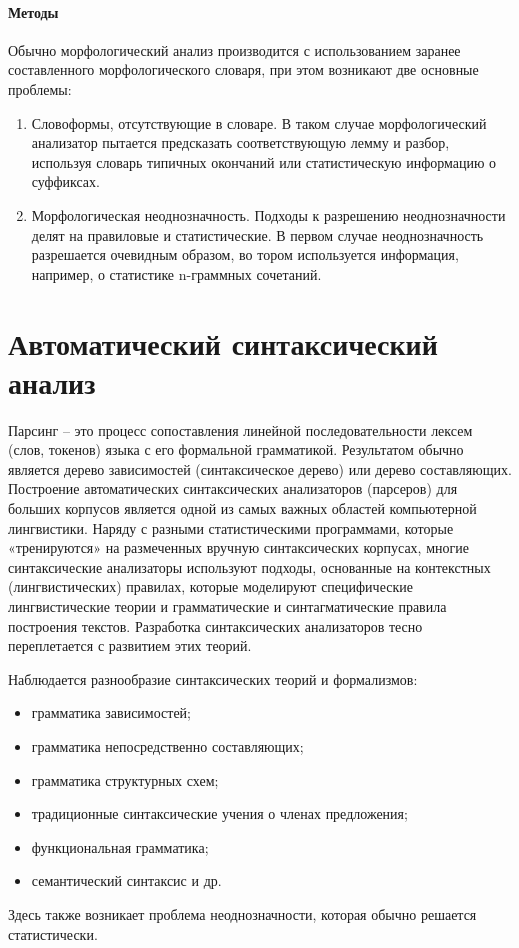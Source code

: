 \documentclass[12pt]{article}
\theoremstyle{definition}
\theoremstyle{remark}
\numberwithin{equation}{section}
\begin{document}
\paragraph{Методы}
Обычно морфологический анализ производится с использованием заранее составленного морфологического словаря, при этом возникают две основные проблемы:
\begin{enumerate}
	\item Словоформы, отсутствующие в словаре. В таком случае морфологический анализатор пытается предсказать соответствующую лемму и разбор, используя словарь типичных окончаний или статистическую информацию о суффиксах.
	\item Морфологическая неоднозначность. Подходы к разрешению неоднозначности делят на правиловые и статистические. В первом случае неоднозначность разрешается очевидным образом, во тором используется информация, например, о статистике n-граммных сочетаний.
\end{enumerate}

\section{Автоматический синтаксический анализ}
Парсинг – это процесс сопоставления линейной последовательности лексем (слов, токенов) языка с его формальной грамматикой. Результатом обычно является дерево зависимостей (синтаксическое дерево) или дерево составляющих. Построение автоматических синтаксических анализаторов (парсеров) для больших корпусов является одной из самых важных областей компьютерной лингвистики. Наряду с разными статистическими программами, которые «тренируются» на размеченных вручную синтаксических корпусах, многие синтаксические анализаторы используют подходы, основанные на контекстных (лингвистических) правилах, которые моделируют специфические лингвистические теории и грамматические и синтагматические правила построения текстов. Разработка синтаксических анализаторов тесно переплетается с развитием этих теорий.

Наблюдается разнообразие синтаксических теорий и формализмов:
\begin{itemize}
	\item грамматика зависимостей;
	\item грамматика непосредственно составляющих;
	\item грамматика структурных схем;
	\item традиционные синтаксические учения о членах предложения;
	\item функциональная грамматика;
	\item семантический синтаксис и др.
\end{itemize}

Здесь также возникает проблема неоднозначности, которая обычно решается статистически.
\end{document}
